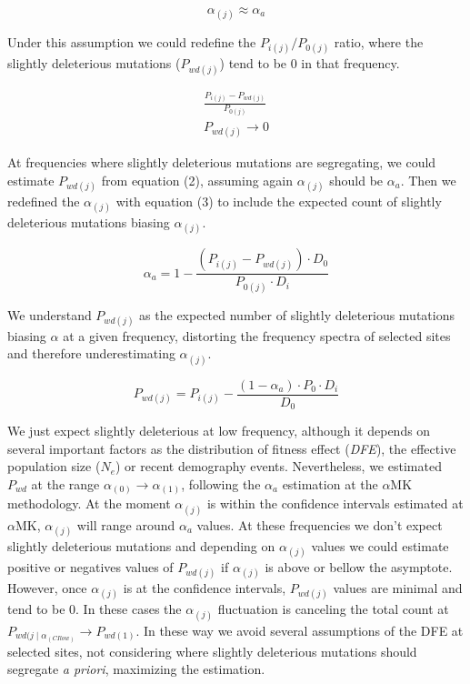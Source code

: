 \documentclass[11pt]{article}
\begin{document}
\begin{equation}
	\alpha_{(j)} \approx \alpha_{a}
\end{equation}

Under this assumption we could redefine the $P_{i(j)}/P_{0(j)}$ ratio, where the slightly deleterious mutations ($P_{wd(j)}$) tend to be 0 in that frequency.

\begin{equation}
\begin{split}
	\frac{P_{i(j)}-P_{wd(j)}}{P_{0(j)}} \\ 	P_{wd(j)} \to 0
\end{split}
\end{equation}

At frequencies where slightly deleterious mutations are segregating, we could estimate $P_{wd(j)}$ from equation (2), assuming again $\alpha_{(j)}$ should be $\alpha_{a}$. Then we redefined the $\alpha_{(j)}$ with equation (3) to include the expected count of slightly deleterious mutations biasing $\alpha_{(j)}$.

\begin{equation}
	 \alpha_{a} = 1 - \frac{(P_{i(j)}-P_{wd(j)}) \cdot D_{0}}{P_{0(j)} \cdot D_{i}}
\end{equation}

We understand $P_{wd(j)}$ as the expected number of slightly deleterious mutations biasing $\alpha$ at a given frequency, distorting the frequency spectra of selected sites and therefore underestimating $\alpha_{(j)}$.

\begin{equation}
	 P_{wd(j)} = P_{i(j)} - \frac{(1-\alpha_{a}) \cdot P_{0} \cdot D_{i}}{D_{0}}
\end{equation}

We just expect slightly deleterious at low frequency, although it depends on several important factors as the distribution of fitness effect (\emph{DFE}), the effective population size ($N_{e}$) or recent demography events. Nevertheless, we estimated $P_{wd}$ at the range $\alpha_{(0)} \to \alpha_{(1)}$, following the $\alpha_{a}$ estimation at the $\alpha$MK methodology. At the moment $\alpha_{(j)}$ is within the confidence intervals estimated at $\alpha$MK, $\alpha_{(j)}$ will range around $\alpha_{a}$ values. At these frequencies we don't expect slightly deleterious mutations and depending on $\alpha_{(j)}$ values we could estimate positive or negatives values of $P_{wd(j)}$ if $\alpha_{(j)}$ is above or bellow the asymptote. However, once $\alpha_{(j)}$ is at the confidence intervals, $P_{wd(j)}$ values are minimal and tend to be 0. In these cases the $\alpha_{(j)}$ fluctuation is canceling the total count at $P_{wd(j \mid \alpha_{(CI low)}} \to P_{wd(1)}$. In these way we avoid several assumptions of the DFE at selected sites, not considering where slightly deleterious mutations should segregate \emph{a priori}, maximizing the estimation.
\end{document}
